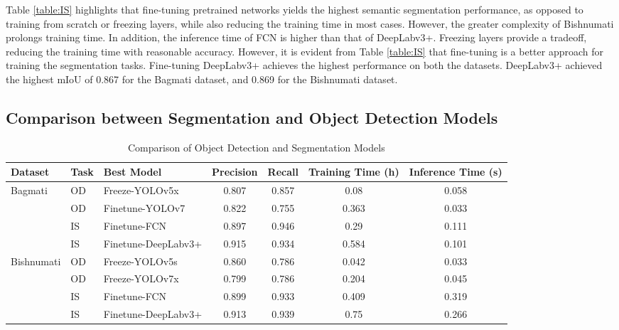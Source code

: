 \documentclass{ieeeaccess}
\begin{document}
Table \ref{table:IS} highlights that fine-tuning pretrained networks yields the highest semantic segmentation performance, as opposed to training from scratch or freezing layers, while also reducing the training time in most cases. However, the greater complexity of Bishnumati prolongs training time. In addition, the inference time of FCN is higher than that of DeepLabv3+. Freezing layers provide a tradeoff, reducing the training time with reasonable accuracy. However, it is evident from Table \ref{table:IS} that fine-tuning is a better approach for training the segmentation tasks. Fine-tuning DeepLabv3+ achieves the highest performance on both the datasets. DeepLabv3+ achieved the highest mIoU of 0.867 for the Bagmati dataset, and 0.869 for the Bishnumati dataset. 

\subsection{Comparison between Segmentation and Object Detection Models}

\begin{table}[]
\centering
\caption{Comparison of Object Detection and Segmentation Models}
\begin{tabular}{lllcccc}
\hline
\textbf{Dataset} & \textbf{Task} & \textbf{Best Model} & \textbf{Precision} & \textbf{Recall} & \textbf{Training Time (h)} & \textbf{Inference Time (s)} \\
\hline
\multirow{4}{*}{Bagmati} & OD & Freeze-YOLOv5x & 0.807 & 0.857 & 0.08  & 0.058 \\
                          & OD & Finetune-YOLOv7 & 0.822 & 0.755 & 0.363 & 0.033 \\
                          & IS & Finetune-FCN    & 0.897 & 0.946 & 0.29  & 0.111 \\
                          & IS & Finetune-DeepLabv3+ & 0.915 & 0.934 & 0.584 & 0.101 \\
\hline
\multirow{4}{*}{Bishnumati} & OD & Freeze-YOLOv5s & 0.860 & 0.786 & 0.042 & 0.033 \\
                             & OD & Freeze-YOLOv7x  & 0.799 & 0.786 & 0.204 & 0.045 \\
                             & IS & Finetune-FCN     & 0.899 & 0.933 & 0.409 & 0.319 \\
                             & IS & Finetune-DeepLabv3+ & 0.913 & 0.939 & 0.75  & 0.266 \\
\hline
\end{tabular}
\label{table:ODvsIS}
\end{table}
\end{document}
